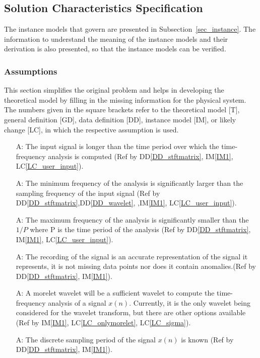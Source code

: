 \documentclass[12pt]{article}
\newcounter{assumpnum} %
\begin{document}
\subsection{Solution Characteristics Specification}

The instance models that govern \progname{} are presented in
Subsection~\ref{sec_instance}.  The information to understand the meaning of the
instance models and their derivation is also presented, so that the instance
models can be verified.

\subsubsection{Assumptions} \label{sec_assumpt}

This section simplifies the original problem and helps in developing the
theoretical model by filling in the missing information for the physical
system. The numbers given in the square brackets refer to the theoretical model
[T], general definition [GD], data definition [DD], instance model [IM], or
likely change [LC], in which the respective assumption is used.

\begin{itemize}

\item[A\refstepcounter{assumpnum}\theassumpnum \label{mintime_assum}:] The input signal is longer than the time period over which the time-frequency analysis is computed (Ref by DD\ref{DD_stftmatrix}, IM\ref{IM1}, LC\ref{LC_user_input}).
\item[A\refstepcounter{assumpnum}\theassumpnum \label{minfreq_assum}:] The minimum frequency of the analysis is significantly larger than the sampling frequency of the input signal (Ref by DD\ref{DD_stftmatrix},DD\ref{DD_wavelet}, ,IM\ref{IM1}, LC\ref{LC_user_input}).
\item[A\refstepcounter{assumpnum}\theassumpnum \label{maxfreq_assum}:] The maximum frequency of the analysis is significantly smaller than the $1/P$ where P is the time period of the analysis (Ref by DD\ref{DD_stftmatrix}, IM\ref{IM1}, LC\ref{LC_user_input}).
\item[A\refstepcounter{assumpnum}\theassumpnum \label{representation_assum}:]The recording of the signal is an accurate representation of the signal it represents, it is not missing data points nor does it contain anomalies.(Ref by DD\ref{DD_stftmatrix}, IM\ref{IM1}).
\item[A\refstepcounter{assumpnum}\theassumpnum \label{morelet_assum}:]A morelet wavelet will be a sufficient wavelet to compute the time-frequency analysis of a signal $x(n)$. Currently, it is the only wavelet being considered for the wavelet transform, but there are other options available (Ref by IM\ref{IM1}, LC\ref{LC_onlymorelet}, LC\ref{LC_sigma}).
\item[A\refstepcounter{assumpnum}\theassumpnum \label{P_assum}:]The discrete sampling period of the signal $x(n)$ is known (Ref by DD\ref{DD_stftmatrix}, IM\ref{IM1}).

\end{itemize}
\end{document}
